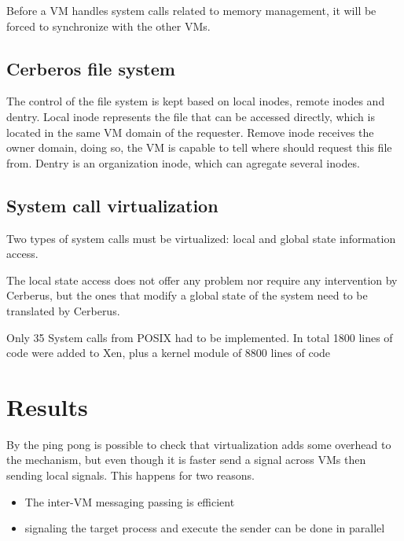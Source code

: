 \documentclass[journal]{IEEEtran}
\begin{document}
\begin{itemize}
	Before a VM handles system calls related to memory management, it will be forced to synchronize with the other VMs.
	
	\subsection{Cerberos file system}
	
	The control of the file system is kept based on local inodes, remote inodes and dentry. Local inode represents the file that can be accessed directly, which is located in the same VM domain of the requester. Remove inode receives the owner domain, doing so, the VM is capable to tell where should request this file from. Dentry is an organization inode, which can agregate several inodes.

	\subsection{System call virtualization}

	Two types of system calls must be virtualized: local and global state information access.
	
	The local state access does not offer any problem nor require any intervention by Cerberus, but the ones that modify a global state of the system need to be translated by Cerberus.
	
	Only 35 System calls from POSIX had to be implemented. In total 1800 lines of code were added to Xen, plus a kernel module of 8800 lines of code %
	
	\section{Results}
	
	By the ping pong is possible to check that virtualization adds some overhead to the mechanism, but even though it is faster send a signal across VMs then sending local signals. This happens for two reasons.
	\begin{itemize}
	\item The inter-VM messaging passing is efficient
	\item signaling the target process and execute the sender can be done in parallel
	\end{itemize}
	
\end{itemize}
\end{document}
